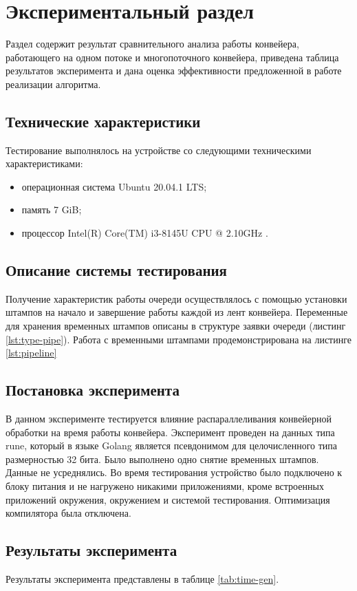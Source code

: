 \chapter{Экспериментальный раздел}\label{sec:exp}
Раздел содержит результат сравнительного анализа работы конвейера, работающего на одном потоке и многопоточного конвейера, приведена таблица результатов эксперимента и дана оценка эффективности предложенной в работе реализации алгоритма.

\section{Технические характеристики}
Тестирование выполнялось на устройстве со следующими техническими характеристиками:
\begin{itemize}
	\item операционная система Ubuntu 20.04.1 LTS;
	\item память 7 GiB;
	\item процессор Intel(R) Core(TM) i3-8145U CPU @ 2.10GHz \cite{intel}.
\end{itemize}

\section{Описание системы тестирования}
Получение характеристик работы очереди осуществлялось с помощью установки штампов на начало и завершение работы каждой из лент конвейера. Переменные для хранения временных штампов описаны в структуре заявки очереди (листинг \ref{lst:type-pipe}). Работа с временными штампами продемонстрирована на листинге \ref{lst:pipeline}

\section{Постановка эксперимента}
В данном эксперименте тестируется влияние распараллеливания конвейерной обработки на время работы конвейера. Эксперимент проведен на данных типа rune, который в языке Golang является псевдонимом для целочисленного типа размерностью 32 бита\cite{rune}.
Было выполнено одно снятие временных штампов. Данные не усреднялись.
Во время тестирования устройство было подключено к блоку питания и не нагружено никакими приложениями, кроме встроенных приложений окружения, окружением и системой тестирования. Оптимизация компилятора была отключена.

\section{Результаты эксперимента}
Результаты эксперимента представлены в таблице \ref{tab:time-gen}.

